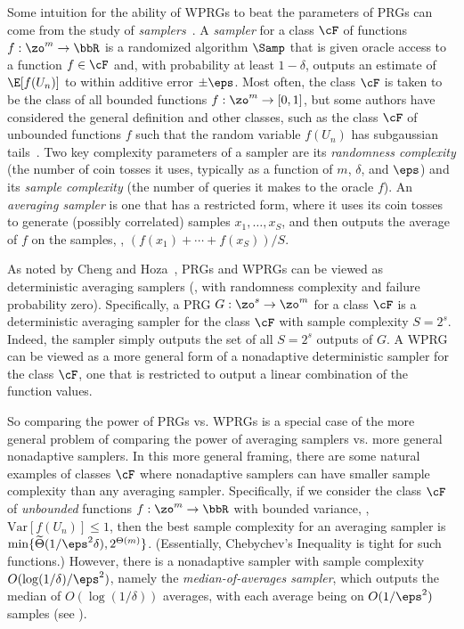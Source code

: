 Some intuition for the ability of WPRGs to beat the parameters of PRGs can come from
the study of \emph{samplers}~\cite{Goldreich97}.  A \emph{sampler} for a class $\cF$ of
functions $f : \zo^m\rightarrow \bbR$ is %
a 
%
randomized algorithm $\Samp$ that is given 
oracle access to a function $f\in \cF$ and, with probability at least $1-\delta$, outputs an estimate of $\E[f(U_n)]$ to within additive error $\pm \eps$. Most often, the class $\cF$ is taken to be the class of all bounded functions $f : \zo^m \rightarrow [0,1]$, but some
%
authors  %
have considered the general definition and other classes, such as the class $\cF$ of unbounded functions $f$ such that the random variable $f(U_n)$ has subgaussian tails~\cite{Blasiok18,Agrawal19}.  Two key complexity parameters of a sampler are its \emph{randomness complexity} (the number of coin tosses it uses, typically as a function of $m$, $\delta$, and $\eps$)  and its 
\emph{sample complexity} (the number of queries it makes to the oracle $f$).
An \emph{averaging sampler} is one that has a restricted form, where it uses its coin tosses to generate (possibly correlated) samples $x_1,\ldots,x_S$, and then outputs the average of $f$
on the samples, \ie, $(f(x_1)+\cdots+f(x_S))/S$.

As noted by Cheng and Hoza~\cite{ChengHo20}, PRGs and WPRGs can be viewed as deterministic averaging samplers (\ie, with randomness complexity and failure probability zero).  Specifically,
a PRG $G : \zo^s\rightarrow \zo^m$ for a class $\cF$ is a deterministic averaging sampler for the class $\cF$ with sample complexity $S=2^s$.  Indeed, the sampler simply outputs the set of all $S=2^s$ outputs of $G$. A WPRG can be viewed as a more general form of a nonadaptive deterministic sampler for the class $\cF$, one that is restricted to output a linear combination of the function values.

So comparing the power of PRGs vs. WPRGs is a special case of the more general problem of comparing the power of averaging samplers vs. more general nonadaptive samplers.  In this more general framing, there are some natural examples of classes $\cF$ where nonadaptive samplers can have smaller sample complexity than any averaging sampler.  Specifically, if we consider the class $\cF$ of \emph{unbounded} functions $f : \zo^m\rightarrow \bbR$ with bounded variance, \ie, $\mathrm{Var}[f(U_n)]\leq 1$, then the best sample complexity for an averaging sampler is
$\min\{\widetilde{\Theta}(1/\eps^2\delta),2^{\Theta(m)}\}$. (Essentially, Chebychev's Inequality is tight for such functions.)  However, there is a nonadaptive sampler with sample complexity $O(\log(1/\delta)/\eps^2)$, namely the \emph{median-of-averages sampler}, which outputs the median of $O(\log(1/\delta))$ averages, with each average being on $O(1/\eps^2)$ samples (see ).


